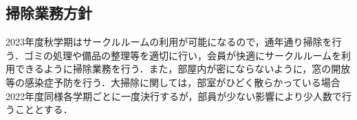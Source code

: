 \subsection*{掃除業務方針}

2023年度秋学期はサークルルームの利用が可能になるので，通年通り掃除を行う．ゴミの処理や備品の整理等を適切に行い，会員が快適にサークルルームを利用できるように掃除業務を行う．また，部屋内が密にならないように，窓の開放等の感染症予防を行う．大掃除に関しては，部室がひどく散らかっている場合2022年度同様各学期ごとに一度決行するが，部員が少ない影響により少人数で行うこととする．

